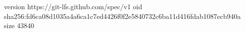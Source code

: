 version https://git-lfs.github.com/spec/v1
oid sha256:fd6ca08d1035a4a6ca1c7ed4426f0f2e5840732c6ba11d416fdab1087ecb940a
size 43840
